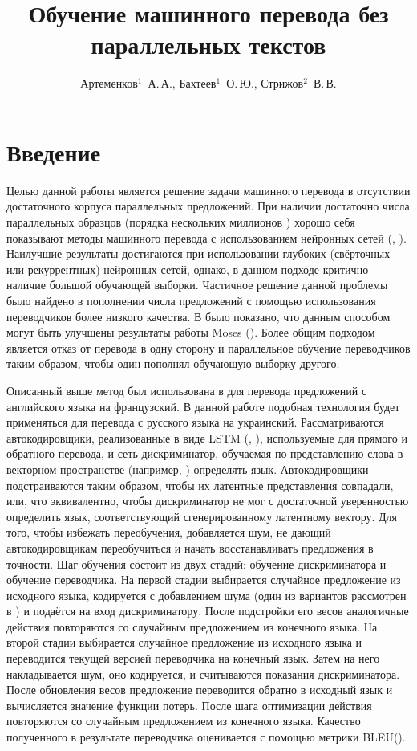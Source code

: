 \documentclass[12pt,twoside]{article}
\title
    [Обучение машинного перевода без параллельных текстов] %
    {Обучение машинного перевода без параллельных текстов}
\author
    [Артеменков$^1$~А.\,А., Бахтеев$^1$~О.\,Ю., Стрижов$^2$~В.\,В.] %
    {Артеменков$^1$~А.\,А., Бахтеев$^1$~О.\,Ю., Стрижов$^2$~В.\,В.} %
    [Артеменков$^1$~А.\,А., Бахтеев$^1$~О.\,Ю., Стрижов$^2$~В.\,В.] %
\begin{document}
\maketitle

\section{Введение}

Целью данной работы является решение задачи машинного перевода в отсутствии достаточного корпуса параллельных предложений. При наличии достаточно числа параллельных образцов (порядка нескольких миллионов \cite{bahdanau2014neural}) хорошо себя показывают методы машинного перевода с использованием нейронных сетей (\cite{cho2014properties}, \cite{luong2015effective}). Наилучшие результаты достигаются при использовании глубоких (свёрточных или рекуррентных) нейронных сетей, однако, в данном подходе критично наличие большой обучающей выборки. Частичное решение данной проблемы было найдено в пополнении числа предложений с помощью использования переводчиков более низкого качества. В \cite{bertoldi2009domain} было показано, что данным способом могут быть улучшены результаты работы Moses (\cite{koehn2007moses}). Более общим подходом является отказ от перевода в одну сторону и параллельное обучение переводчиков таким образом, чтобы один пополнял обучающую выборку другого.

Описанный выше метод был использована в \cite{lample2017unsupervised} для перевода предложений с английского языка на французский. В данной работе подобная технология будет применяться для перевода с русского языка на украинский. Рассматриваются автокодировщики, реализованные в виде LSTM (\cite{gers1999learning}, \cite{graves2005framewise}), используемые для прямого и обратного перевода, и сеть-дискриминатор, обучаемая по представлению слова в векторном пространстве (например, \cite{goldberg2014word2vec}) определять язык. Автокодировщики подстраиваются таким образом, чтобы их латентные представления совпадали, или, что эквивалентно, чтобы дискриминатор не мог с достаточной уверенностью определить язык, соответствующий сгенерированному латентному вектору. Для того, чтобы избежать переобучения, добавляется шум, не дающий автокодировщикам переобучиться и начать восстанавливать предложения в точности. Шаг обучения состоит из двух стадий: обучение дискриминатора и обучение переводчика. На первой стадии выбирается случайное предложение из исходного языка, кодируется с добавлением шума (один из вариантов рассмотрен в \cite{kimimproving}) и подаётся на вход дискриминатору. После подстройки его весов аналогичные действия повторяются со случайным предложением из конечного языка. На второй стадии выбирается случайное предложение из исходного языка и переводится текущей версией переводчика на конечный язык. Затем на него накладывается шум, оно кодируется, и считываются показания дискриминатора. После обновления весов предложение переводится обратно в исходный язык и вычисляется значение функции потерь. После шага оптимизации действия повторяются со случайным предложением из конечного языка. Качество полученного в результате переводчика оценивается с помощью метрики BLEU(\cite{papineni2002bleu}).






\end{document}
